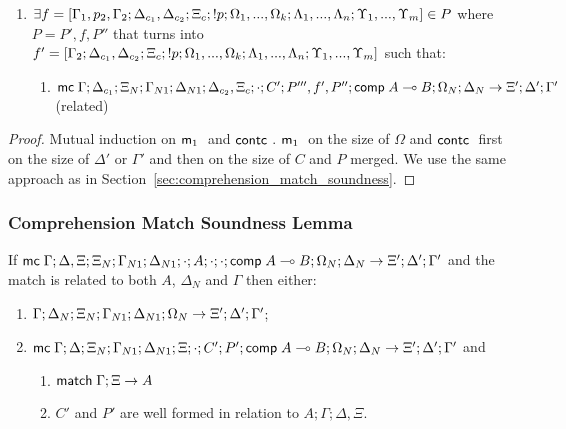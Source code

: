 \begin{theorem}
\begin{itemize}
\begin{enumerate}
      \item $\exists f = [\Gamma_1, p_2, \Gamma_2; \Delta_{c_1}, \Delta_{c_2}; \Xi_c; {!} p; \Omega_1, ..., \Omega_k; \Lambda_1, ..., \Lambda_n; \Upsilon_1, ..., \Upsilon_m] \in P$ where $P = P', f, P''$ that turns into $f' = [\Gamma_2; \Delta_{c_1}, \Delta_{c_2}; \Xi_c; {!} p; \Omega_1, ..., \Omega_k; \Lambda_1, ..., \Lambda_n; \Upsilon_1, ..., \Upsilon_m]$ such that:
            \begin{enumerate}
               \item $\mathsf{mc} \; \Gamma; \Delta_{c_1}; \Xi_N; \Gamma_{N1}; \Delta_{N1}; \Delta_{c_2}, \Xi_c; \cdot; C'; P''', f', P''; \mathsf{comp} \; A \multimap B; \Omega_N; \Delta_N \rightarrow \Xi'; \Delta'; \Gamma'$ (related)
            \end{enumerate}
   \end{enumerate}
   \end{itemize}
\end{theorem}

\begin{proof}
   Mutual induction on $\mathsf{m}_1 \;$ and $\mathsf{contc} \;$. $\mathsf{m}_1 \;$ on the size of $\Omega$ and $\mathsf{contc} \;$ first on the size of $\Delta'$ or $\Gamma'$ and then on the size of $C$ and $P$ merged. We use the same approach as in Section~\ref{sec:comprehension_match_soundness}.
\end{proof}

\subsubsection{Comprehension Match Soundness Lemma}

\begin{lemma}
If $\mathsf{mc} \; \Gamma; \Delta, \Xi; \Xi_N; \Gamma_{N1}; \Delta_{N1}; \cdot; A; \cdot; \cdot; \mathsf{comp} \; A \multimap B; \Omega_N; \Delta_N \rightarrow \Xi'; \Delta'; \Gamma'$ and the match is related to both $A$, $\Delta_N$ and $\Gamma$ then either:
\begin{enumerate}
   \item $\do \Gamma; \Delta_N; \Xi_N; \Gamma_{N1}; \Delta_{N1}; \Omega_N \rightarrow \Xi'; \Delta'; \Gamma'$;
   \item $\mathsf{mc} \; \Gamma; \Delta; \Xi_N; \Gamma_{N1}; \Delta_{N1}; \Xi; \cdot; C'; P'; \mathsf{comp} \; A \multimap B; \Omega_N; \Delta_N \rightarrow \Xi'; \Delta'; \Gamma'$ and
   \begin{enumerate}
      \item $\mathsf{match} \; \Gamma; \Xi \rightarrow A$
      \item $C'$ and $P'$ are well formed in relation to $A; \Gamma; \Delta, \Xi$.
   \end{enumerate}
\end{enumerate}
\end{lemma}

